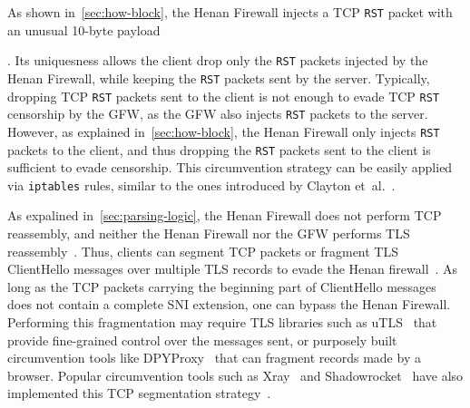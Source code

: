 \documentclass[conference,compsoc]{IEEEtran}
\begin{document}
As shown in~\autoref{sec:how-block},
the Henan Firewall injects a TCP \texttt{RST} packet with an unusual 10-byte payload
\begin{bytebox}\end{bytebox}.
Its uniquesness allows the client drop only the \texttt{RST} packets injected by the Henan Firewall,
while keeping the \texttt{RST} packets sent by the server.
Typically,
dropping TCP \texttt{RST} packets sent to the client is not enough to evade TCP \texttt{RST} censorship by the GFW,
as the GFW also injects \texttt{RST} packets to the server.
However, as explained in~\autoref{sec:how-block},
the Henan Firewall only injects \texttt{RST} packets to the client,
and thus dropping the \texttt{RST} packets sent to the client is sufficient to evade censorship.
This circumvention strategy can be easily applied via \texttt{iptables} rules,
similar to the ones introduced by Clayton et~al.~\cite[\S 5]{Clayton2006a}.


As expalined in~\autoref{sec:parsing-logic},
the Henan Firewall does not perform TCP reassembly,
and neither the Henan Firewall nor the GFW performs TLS reassembly~\cite{Niere2023a}.
Thus, clients can segment TCP packets or
fragment TLS ClientHello messages over multiple TLS records to evade the Henan firewall~\cite{Niere2023a}.
As long as the TCP packets carrying the beginning part of ClientHello messages
does not contain a complete SNI extension,
one can bypass the Henan Firewall.
Performing this fragmentation may require TLS libraries such as uTLS~\cite{Frolov2019a} that
provide fine-grained control over the messages sent, or purposely built
circumvention tools like DPYProxy~\cite{GoodbyeDPI} that can fragment records
made by a browser.
Popular circumvention tools such as
Xray~\cite{Xray} and Shadowrocket~\cite{shadowrocket}
have also implemented this TCP segmentation strategy~\cite{xraypullrrequest}.



%
%
\end{document}
